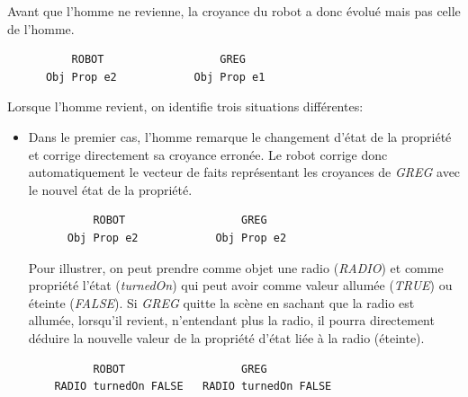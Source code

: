 \documentclass[a4paper,11pt,twoside]{StyleThese}
\begin{document}
Avant que l'homme ne revienne, la croyance du robot a donc évolué mais pas celle de l'homme.

\begin{scriptsize}
\begin{verbatim}
          ROBOT                  GREG
      Obj Prop e2            Obj Prop e1
\end{verbatim}
\end{scriptsize}

Lorsque l'homme revient, on identifie trois situations différentes:

\begin{itemize}
\item Dans le premier cas, l'homme remarque le changement d'état de la propriété et corrige directement sa croyance erronée. Le robot corrige donc automatiquement le vecteur de faits représentant les croyances de \textit{GREG} avec le nouvel état de la propriété. 


\begin{scriptsize}
\begin{verbatim}
          ROBOT                  GREG
      Obj Prop e2            Obj Prop e2
\end{verbatim}
\end{scriptsize}


Pour illustrer, on peut prendre comme objet une radio (\textit{RADIO}) et comme propriété l'état (\textit{turnedOn}) qui peut avoir comme valeur allumée (\textit{TRUE}) ou éteinte (\textit{FALSE}). Si \textit{GREG} quitte la scène en sachant que la radio est allumée, lorsqu'il revient, n'entendant plus la radio, il pourra directement déduire la nouvelle valeur de la propriété d'état liée à la radio (éteinte).


\begin{scriptsize}
\begin{verbatim}
          ROBOT                  GREG
    RADIO turnedOn FALSE   RADIO turnedOn FALSE
\end{verbatim}
\end{scriptsize}



\end{itemize}
\end{document}
